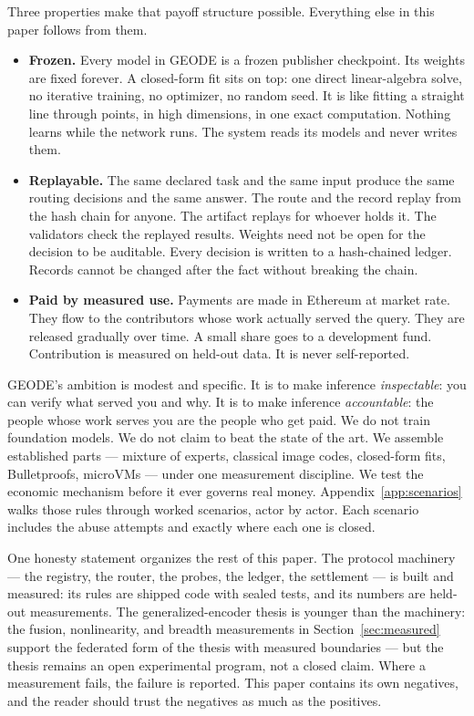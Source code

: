 \documentclass[11pt]{article}
\begin{document}
Three properties make that payoff structure possible. Everything
else in this paper follows from them.

\begin{itemize}
\item \textbf{Frozen.} Every model in GEODE is a frozen publisher
checkpoint. Its weights are fixed forever. A closed-form fit sits
on top: one direct linear-algebra solve, no iterative training, no
optimizer, no random seed. It is like fitting a straight line
through points, in high dimensions, in one exact computation.
Nothing learns while the network runs. The system reads its models
and never writes them.
\item \textbf{Replayable.} The same declared task and the same
input produce the same routing decisions and the same answer. The
route and the record replay from the hash chain for anyone. The
artifact replays for whoever holds it. The validators check the
replayed results. Weights need not be open for the decision to be
auditable. Every decision is written to a hash-chained ledger.
Records cannot be changed after the fact without breaking the
chain.
\item \textbf{Paid by measured use.} Payments are made in Ethereum
at market rate. They flow to the contributors whose work actually
served the query. They are released gradually over time. A small
share goes to a development fund. Contribution is measured on
held-out data. It is never self-reported.
\end{itemize}

GEODE's ambition is modest and specific. It is to make inference
\emph{inspectable}: you can verify what served you and why. It is
to make inference \emph{accountable}: the people whose work serves
you are the people who get paid. We do not train foundation
models. We do not claim to beat the state of the art. We assemble
established parts --- mixture of experts, classical image codes,
closed-form fits, Bulletproofs, microVMs --- under one measurement
discipline. We test the economic mechanism before it ever governs
real money. Appendix~\ref{app:scenarios} walks those rules through
worked scenarios, actor by actor. Each scenario includes the abuse
attempts and exactly where each one is closed.

One honesty statement organizes the rest of this paper. The
protocol machinery --- the registry, the router, the probes, the
ledger, the settlement --- is built and measured: its rules are
shipped code with sealed tests, and its numbers are held-out
measurements. The generalized-encoder thesis is younger than the
machinery: the fusion, nonlinearity, and breadth measurements in
Section~\ref{sec:measured} support the federated form of the
thesis with measured boundaries --- but the thesis remains an
open experimental program, not a closed claim. Where a
measurement fails, the failure is reported. This paper contains
its own negatives, and the reader should trust the negatives as
much as the positives.
\end{document}
